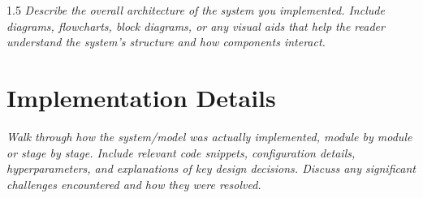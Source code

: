 \begin{spacing}{1.5}
\textit{Describe the overall architecture of the system you implemented. Include diagrams, flowcharts, block diagrams, or any visual aids that help the reader understand the system's structure and how components interact.}

\section{Implementation Details}

\textit{Walk through how the system/model was actually implemented, module by module or stage by stage. Include relevant code snippets, configuration details, hyperparameters, and explanations of key design decisions. Discuss any significant challenges encountered and how they were resolved.}

\end{spacing}
